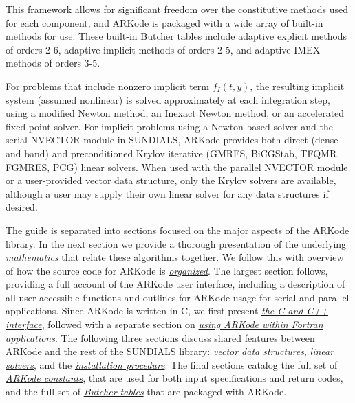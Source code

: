 \documentclass[letterpaper,10pt,english]{sphinxmanual}
\begin{document}
This framework allows for significant freedom over the constitutive
methods used for each component, and ARKode is packaged with a wide
array of built-in methods for use.  These built-in Butcher tables
include adaptive explicit methods of orders 2-6, adaptive implicit
methods of orders 2-5, and adaptive IMEX methods of orders 3-5.

For problems that include nonzero implicit term $f_I(t,y)$, the
resulting implicit system (assumed nonlinear) is solved approximately
at each integration step, using a modified Newton method, an Inexact
Newton method, or an accelerated fixed-point solver.  For implicit
problems using a Newton-based solver and the serial NVECTOR module in
SUNDIALS, ARKode provides both direct (dense and band) and
preconditioned Krylov iterative (GMRES, BiCGStab, TFQMR, FGMRES, PCG)
linear solvers.  When used with the parallel NVECTOR module or a
user-provided vector data structure, only the Krylov solvers are
available, although a user may supply their own linear solver for any
data structures if desired.

The guide is separated into sections focused on the major aspects of
the ARKode library.  In the next section we provide a thorough
presentation of the underlying {\hyperref[Mathematics:mathematics]{\emph{mathematics}}} that
relate these algorithms together.  We follow this with overview of how
the source code for ARKode is {\hyperref[Organization:organization]{\emph{organized}}}.  The
largest section follows, providing a full account of the ARKode user
interface, including a description of all user-accessible functions
and outlines for ARKode usage for serial and parallel applications.
Since ARKode is written in C, we first present {\hyperref[c_interface/index:cinterface]{\emph{the C and C++
interface}}}, followed with a separate section on
{\hyperref[f_interface/index:fortraninterface]{\emph{using ARKode within Fortran applications}}}.  The
following three sections discuss shared features between ARKode and
the rest of the SUNDIALS library: {\hyperref[nvectors/index:nvectors]{\emph{vector data structures}}},
{\hyperref[linear_solvers/index:linearsolvers]{\emph{linear solvers}}}, and the {\hyperref[Install:installation]{\emph{installation
procedure}}}.  The final sections catalog the full set of
{\hyperref[Constants:constants]{\emph{ARKode constants}}}, that are used for both input
specifications and return codes, and the full set of
{\hyperref[Butcher:butcher]{\emph{Butcher tables}}} that are packaged with
ARKode.
\end{document}
